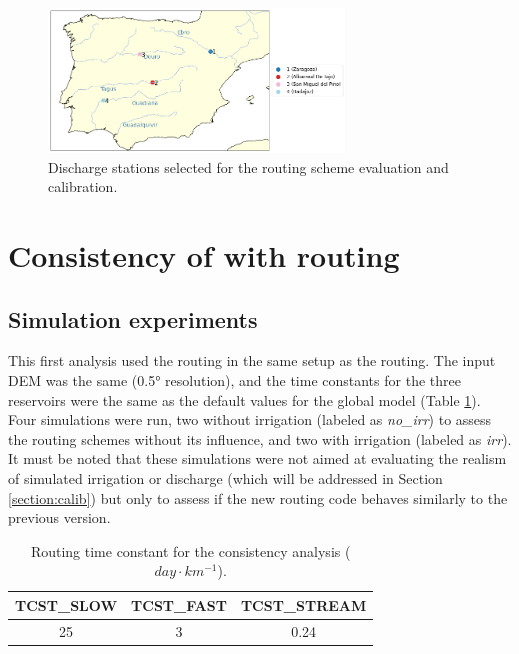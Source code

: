 \begin{figure}[htbp]
    \centering
    \includegraphics[width=0.7\textwidth]{images/chap3/river_discharge/halfdeg_4stations_map.png}
    \caption{Discharge stations selected for the routing scheme evaluation and calibration.}
    \label{fig:halfedg_stations_map}
\end{figure}

\section{Consistency of \native with \std routing}
\subsection{Simulation experiments}

This first analysis used the \native routing in the same setup as the \std routing. 
The input DEM was the same (0.5° resolution), and the time constants for the three reservoirs were the same as the default values for the global model (Table \ref{table:tcst_consistency}).
Four simulations were run, two without irrigation (labeled as \textit{no\_irr}) to assess the routing schemes without its influence, and two with irrigation (labeled as \textit{irr}). It must be noted that these simulations were not aimed at evaluating the realism of simulated irrigation or discharge (which will be addressed in Section \ref{section:calib}) but only to assess if the new routing code behaves similarly to the previous version.

\begin{table}[h]
\centering
\begin{tabular}{|c|c|c|}
\hline
\textbf{TCST\_SLOW} & \textbf{TCST\_FAST} & \textbf{TCST\_STREAM} \\ \hline
25            & 3             & 0.24            \\ \hline
\end{tabular}
\caption{Routing time constant for the consistency analysis ($day \cdot km^{-1}$).}
\label{table:tcst_consistency}
\end{table}

